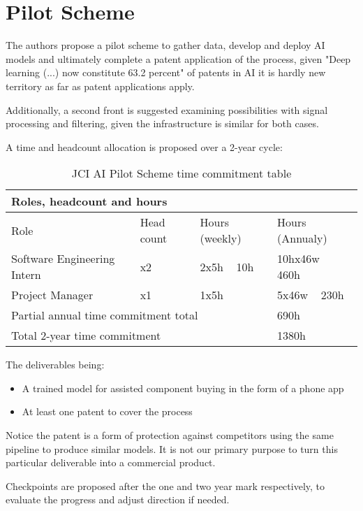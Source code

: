 \section{Pilot Scheme}

The authors propose a pilot scheme to gather data, develop and deploy AI models and ultimately complete a patent application of the process, given "Deep learning (...) now constitute 63.2 percent" of patents in AI it is hardly new territory \cite{Wipo2019} as far as patent applications apply.

Additionally, a second front is suggested examining possibilities with signal processing and filtering, given the infrastructure is similar for both cases.

A time and headcount allocation is proposed over a 2-year cycle:

\begin{table}[ht]
\centering
\begin{tabular}{|l|l|l|l|}
\hline
\multicolumn{4}{|l|}{Roles, headcount and hours} \\ \hline
Role  &  Head count & Hours (weekly) & Hours (Annualy) \\ \hline
Software Engineering Intern & x2 & 2x5h ~ 10h  & 10hx46w ~ 460h\\ \hline
Project Manager & x1 & 1x5h & 5x46w ~ 230h \\ \hline
\multicolumn{3}{|1|}{Partial annual time commitment total} & 690h \\ \hline
\multicolumn{3}{|1|}{Total 2-year time commitment} & 1380h \\ \hline


\end{tabular}
\caption{JCI AI Pilot Scheme time commitment table}
\label{table:kysymys}
\end{table}

The deliverables being:

\begin{itemize}
    \item A trained model for assisted component buying in the form of a phone app
    \item At least one patent to cover the process
\end{itemize}

Notice the patent is a form of protection against competitors using the same pipeline to produce similar models. It is not our primary purpose to turn this particular deliverable into a commercial product. 

Checkpoints are proposed after the one and two year mark respectively, to evaluate the progress and adjust direction if needed.



